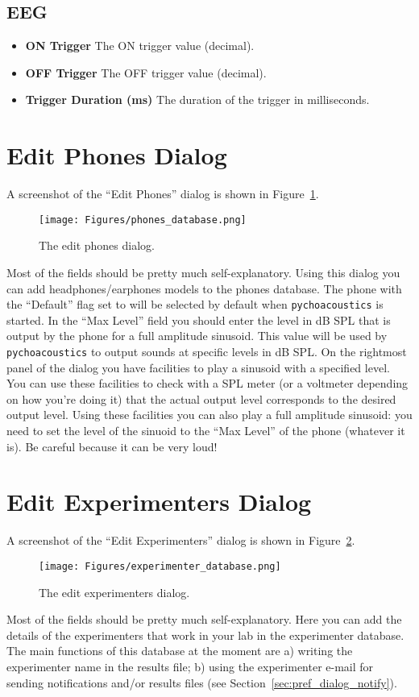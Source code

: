 \subsection{EEG}
\label{sec:pref_dialog_eeg}
\begin{itemize}
\item \textbf{ON Trigger} The ON trigger value (decimal).
\item \textbf{OFF Trigger} The OFF trigger value (decimal).
\item \textbf{Trigger Duration (ms)} The duration of the trigger in milliseconds.
\end{itemize}


\section{Edit Phones Dialog}
\label{sec:phones_dialog}
A screenshot of the ``Edit Phones'' dialog is shown in Figure~\ref{fig:phones_dialog}.
\begin{figure}[!hbt]
   \caption{The edit phones dialog.}
   \centering
   \texttt{[image: Figures/phones\_database.png]}
   \label{fig:phones_dialog}
 \end{figure}
Most of the fields should be pretty much self-explanatory. Using this dialog you can add headphones/earphones
models to the phones database. The phone with the ``Default'' flag set to  will be selected by default when \texttt{pychoacoustics} is started. In the ``Max Level'' field you should enter the level in dB SPL that is output by the phone for a full amplitude sinusoid. This value will be used by \texttt{pychoacoustics} to output sounds at specific levels in dB SPL. On the rightmost panel of the dialog you have facilities to play a sinusoid with a specified level. You can use these facilities to check with a SPL meter (or a voltmeter depending on how you're doing it) that the actual output level corresponds to the desired output level. Using these facilities you can also play a full amplitude sinusoid: you need to set the level of the sinuoid to the ``Max Level'' of the phone (whatever it is). Be careful because it can be very loud!

\section{Edit Experimenters Dialog}
\label{sec:experimenters_dialog}
A screenshot of the ``Edit Experimenters'' dialog is shown in Figure~\ref{fig:experimenters_dialog}.
\begin{figure}[!h]
   \caption{The edit experimenters dialog.}
   \centering
   \texttt{[image: Figures/experimenter\_database.png]}
   \label{fig:experimenters_dialog}
 \end{figure}
Most of the fields should be pretty much self-explanatory. Here you can add
the details of the experimenters that work in your lab in the experimenter
database. The main functions of this database at the moment are a) writing
the experimenter name in the results file; b) using the experimenter e-mail 
for sending notifications and/or results files (see Section~\ref{sec:pref_dialog_notify}).



